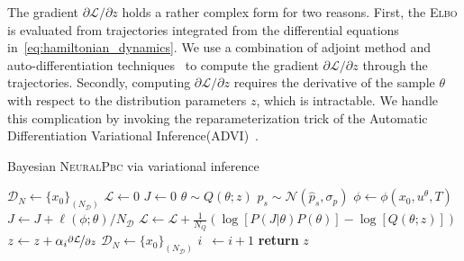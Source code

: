 \begin{enumerate}
    The gradient ${\partial \mathcal{L}}/{\partial z}$ holds a rather complex form for two reasons.
    First, the \textsc{Elbo} is evaluated from trajectories integrated from the differential equations in~\eqref{eq:hamiltonian_dynamics}.
    We use a combination of adjoint method and auto-differentiation techniques~\cite{chen2018neural} to compute the
    gradient ${\partial \mathcal{L}}/{\partial z}$ through the trajectories.
    Secondly, computing ${\partial \mathcal{L}}/{\partial z}$ requires the derivative
    of the sample $\theta$ with respect to the distribution parameters $z$, which is
    intractable. We handle this complication by invoking the reparameterization
    trick of the Automatic Differentiation Variational
    Inference(\textsc{ADVI})~\cite{kucukelbir2015automatic}.

    \begin{algorithm}
        \caption{Bayesian \textsc{NeuralPbc} via variational inference}
        \label{algo:vi}
        \small
        \begin{algorithmic}[1]
            \algrenewcommand\algorithmicindent{0em} %
            \State $\mathcal{D}_N \gets \{x_0\}_{(N_{\mathcal{D}})}$   
            \algrenewcommand\algorithmicindent{1.1em} %
            \State $\mathcal{L} \gets 0$ 
             
            \State $J \gets 0$ 
            \State $\theta \sim Q(\theta; z)$ 
                \State $p_s \sim \mathcal{N}(\hat{p}_s, \sigma_p)$
                \State $\phi \leftarrow \phi(x_0, u^\theta, T) $
                \State $J \gets J + \ell(\phi; \theta)/N_{\mathcal{D}}$ 
                \EndFor
            \State $\mathcal{L} \gets \mathcal{L} + \frac{1}{N_Q} \left(\log[P(J | \theta) P(\theta)] - \log[Q(\theta;z)]\right)$
            \EndFor
            \State $z \gets z + \alpha_i \nicefrac{\partial \mathcal{L}}{\partial z}$
            \State $\mathcal{D}_N \gets \{x_0\}_{(N_{\mathcal{D}})}$
            \State $i \;\:\gets i + 1$
            \EndWhile
            \State \textbf{return} $z$
        \end{algorithmic}
    \end{algorithm}
  
    \end{enumerate}


